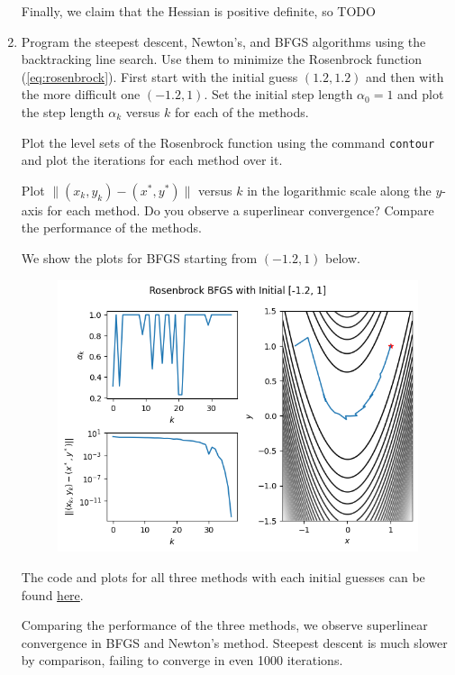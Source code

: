 \documentclass{../kin_math}
\begin{document}
\begin{questions}
\begin{enumerate}
\begin{solution}
      Finally, we claim that the Hessian is positive definite, so TODO
    \end{solution}
    \item Program the steepest descent, Newton's, and BFGS algorithms using the backtracking line search. Use them to minimize the Rosenbrock function (\ref{eq:rosenbrock}). First start with the initial guess $(1.2, 1.2)$ and then with the more difficult one $(-1.2, 1)$. Set the initial step length $\alpha_0 = 1$ and plot the step length $\alpha_k$ versus $k$ for each of the methods.

    Plot the level sets of the Rosenbrock function using the command \texttt{contour} and plot the iterations for each method over it.

    Plot $\lVert (x_k, y_k) - (x^*, y^*) \rVert$ versus $k$ in the logarithmic scale along the $y$-axis for each method. Do you observe a superlinear convergence? Compare the performance of the methods.
    \begin{solution}
      We show the plots for BFGS starting from $(-1.2, 1)$ below.
      \begin{figure}
        \centering
        \includegraphics[scale=0.7]{rosenbrock.png}
      \end{figure}
      The code and plots for all three methods with each initial guesses can be found \href{https://github.com/elijahkin/amsc660/blob/main/hw10/hw10.ipynb}{here}.

      Comparing the performance of the three methods, we observe superlinear convergence in BFGS and Newton's method. Steepest descent is much slower by comparison, failing to converge in even 1000 iterations.
    \end{solution}
  \end{enumerate}
\end{questions}
\end{document}
